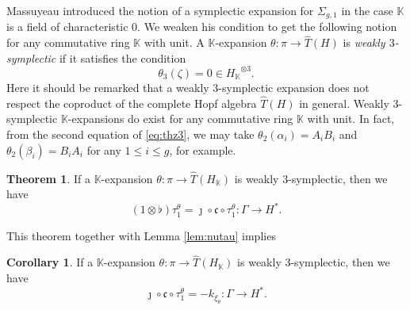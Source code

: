 \documentclass[a4paper,12pt, twoside]{amsart}
\theoremstyle{definition}
\newtheorem{thm}[dfn]{Theorem}
\newtheorem{cor}[dfn]{Corollary}
\theoremstyle{remark}
\numberwithin{equation}{section}
\newcommand\bK{{\mathbb{K}}}
\newcommand\HK{H_{\mathbb{K}}}
\newcommand\Sgone{\Sigma_{g,1}}
\begin{document}
Massuyeau \cite{Mas12} introduced the notion of a symplectic expansion for $\Sgone$ in the case $\bK$ is a field of characteristic $0$. 
We weaken his condition to get the following notion for any commutative ring $\bK$ with unit. 
A $\bK$-expansion $\theta: \pi \to \widehat{T}(H)$ is {\it weakly $3$-symplectic} if it satisfies the condition
\begin{equation}\label{eq:wsymp}
\theta_3(\zeta) = 0 \in {\HK}^{\otimes 3}.
\end{equation}
Here it should be remarked that a weakly $3$-symplectic expansion does not respect the coproduct of the complete Hopf algebra $\widehat{T}(H)$ in general. 
Weakly $3$-symplectic $\bK$-expansions do exist for any commutative ring $\bK$ with unit. In fact, from the second equation of \eqref{eq:thz3}, we may take $\theta_2(\alpha_i) = A_iB_i$ and $\theta_2(\beta_i) = B_iA_i$ for any $1 \leq i \leq g$, for example.\par
\begin{thm}\label{thm:tauc}
If a $\bK$-expansion $\theta: \pi \to \widehat{T}(\HK)$ is weakly $3$-symplectic, then we have
$$
(1\otimes \flat)\tau^\theta_1 = \jmath\circ\mathfrak{c}\circ \tau^\theta_1: \Gamma \to H^*.
$$
\end{thm}

This theorem together with Lemma \ref{lem:nutau} implies 
\begin{cor}\label{cor:ktauc}
If a $\bK$-expansion $\theta: \pi \to \widehat{T}(\HK)$ is weakly $3$-symplectic, then we have
$$
\jmath\circ\mathfrak{c}\circ \tau^\theta_1 = -k_{\xi_\theta}: \Gamma \to H^*.
$$
\end{cor}
\end{document}
